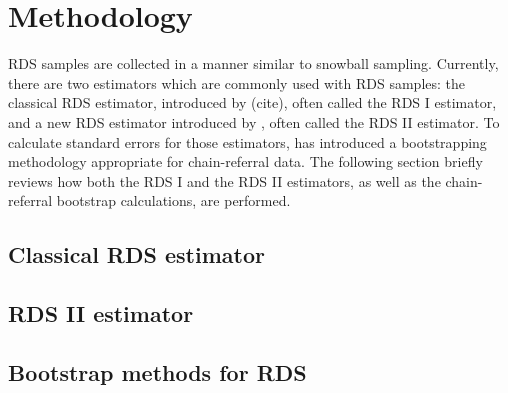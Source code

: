 \documentclass[article, shortnames]{jss}
\begin{document}
\section[Methodology]{Methodology}
RDS samples are collected in a manner similar to snowball sampling.  Currently, there are two estimators which are commonly used with RDS samples: the classical RDS estimator, introduced by (cite), often called the RDS I estimator, and a new RDS estimator introduced by \citet{vh2008}, often called the RDS II estimator.  To calculate standard errors for those estimators, \citet{salganik2006} has introduced a bootstrapping methodology appropriate for chain-referral data.  The following section briefly reviews how both the RDS I and the RDS II estimators, as well as the chain-referral bootstrap calculations, are performed.

\subsection{Classical RDS estimator}
\subsection{RDS II estimator}
\subsection{Bootstrap methods for RDS}


\end{document}
